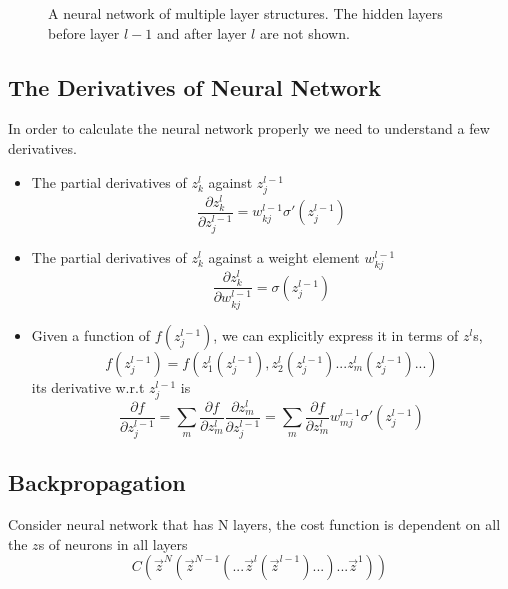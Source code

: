 \documentclass[12pt, oneside]{article}
\begin{document}
\begin{figure}
\center

\caption{A neural network of multiple layer structures. The hidden layers before layer $l-1$ and after layer $l$ are not shown. }
\end{figure}


\subsection{The Derivatives of Neural Network}
In order to calculate the neural network properly we need to understand a few derivatives.

\begin{itemize}
\item The partial derivatives of $z^{l}_k$ against $z^{l-1}_j$
\begin{equation}
\frac{\partial z^{l}_k}{\partial z_j^{l-1}}=w^{l-1}_{kj}\sigma'(z^{l-1}_j)
\end{equation}

\item The partial derivatives of $z^{l}_k$ against a weight element $w_{kj}^{l-1}$
\begin{equation}
\frac{\partial z^{l}_k}{\partial w_{kj}^{l-1}}=\sigma(z^{l-1}_j)
\end{equation}

\item Given a function of $f(z^{l-1}_j)$, we can explicitly express it in terms of $z^{l}$s,
$$
f(z^{l-1}_j)=f(z^l_1(z^{l-1}_j), z^l_2(z^{l-1}_j)...z^l_m(z^{l-1}_j)...)
$$
its derivative w.r.t $z^{l-1}_j$ is
\begin{equation}
\frac{\partial f}{\partial z^{l-1}_j}=\sum\limits_m \frac{\partial f}{\partial z^{l}_m}\frac{\partial z^l_m}{\partial z^{l-1}_j}=\sum\limits_m \frac{\partial f}{\partial z^{l}_m}w^{l-1}_{mj}\sigma'(z^{l-1}_j)
\end{equation}

\end{itemize}



\subsection{Backpropagation}
Consider neural network that has N layers, the cost function is dependent on all the $z$s of neurons in all layers
\begin{equation}
C\left(\vec{z}^N(\vec{z}^{N-1}(...\vec{z}^{l}(\vec{z}^{l-1})...) ...\vec{z}^1)\right)
\end{equation}
\end{document}
